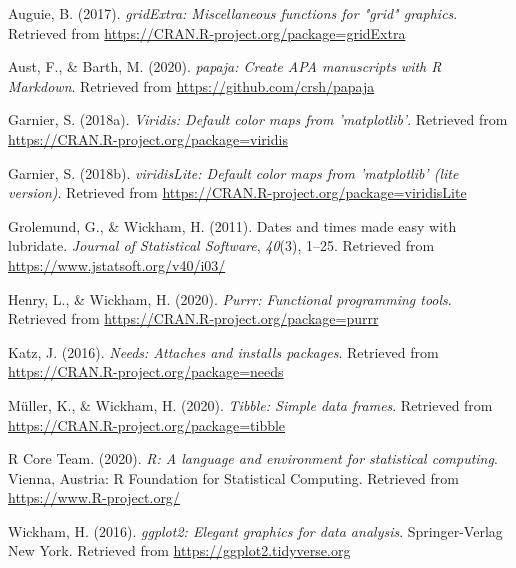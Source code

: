 \documentclass[
  english,
  man,floatsintext]{apa6}
\newlength{\cslhangindent}
\newlength{\cslentryspacingunit} %
\newenvironment{CSLReferences}[2] %
 {%
  \setlength{\parindent}{0pt}
  \ifodd #1
  \let\oldpar\par
  \def\par{\hangindent=\cslhangindent\oldpar}
  \fi
  \setlength{\parskip}{#2\cslentryspacingunit}
 }%
 {}
\begin{document}
\begingroup
\setlength{\parindent}{-0.5in}
\setlength{\leftskip}{0.5in}

\hypertarget{refs}{}
\begin{CSLReferences}{1}{0}
\leavevmode{}%
Auguie, B. (2017). \emph{gridExtra: Miscellaneous functions for "grid" graphics}. Retrieved from \url{https://CRAN.R-project.org/package=gridExtra}

\leavevmode{}%
Aust, F., \& Barth, M. (2020). \emph{{papaja}: {Create} {APA} manuscripts with {R Markdown}}. Retrieved from \url{https://github.com/crsh/papaja}

\leavevmode{}%
Garnier, S. (2018a). \emph{Viridis: Default color maps from 'matplotlib'}. Retrieved from \url{https://CRAN.R-project.org/package=viridis}

\leavevmode{}%
Garnier, S. (2018b). \emph{viridisLite: Default color maps from 'matplotlib' (lite version)}. Retrieved from \url{https://CRAN.R-project.org/package=viridisLite}

\leavevmode{}%
Grolemund, G., \& Wickham, H. (2011). Dates and times made easy with {lubridate}. \emph{Journal of Statistical Software}, \emph{40}(3), 1--25. Retrieved from \url{https://www.jstatsoft.org/v40/i03/}

\leavevmode{}%
Henry, L., \& Wickham, H. (2020). \emph{Purrr: Functional programming tools}. Retrieved from \url{https://CRAN.R-project.org/package=purrr}

\leavevmode{}%
Katz, J. (2016). \emph{Needs: Attaches and installs packages}. Retrieved from \url{https://CRAN.R-project.org/package=needs}

\leavevmode{}%
Müller, K., \& Wickham, H. (2020). \emph{Tibble: Simple data frames}. Retrieved from \url{https://CRAN.R-project.org/package=tibble}

\leavevmode{}%
R Core Team. (2020). \emph{R: A language and environment for statistical computing}. Vienna, Austria: R Foundation for Statistical Computing. Retrieved from \url{https://www.R-project.org/}

\leavevmode{}%
Wickham, H. (2016). \emph{ggplot2: Elegant graphics for data analysis}. Springer-Verlag New York. Retrieved from \url{https://ggplot2.tidyverse.org}


\end{CSLReferences}
\end{document}
